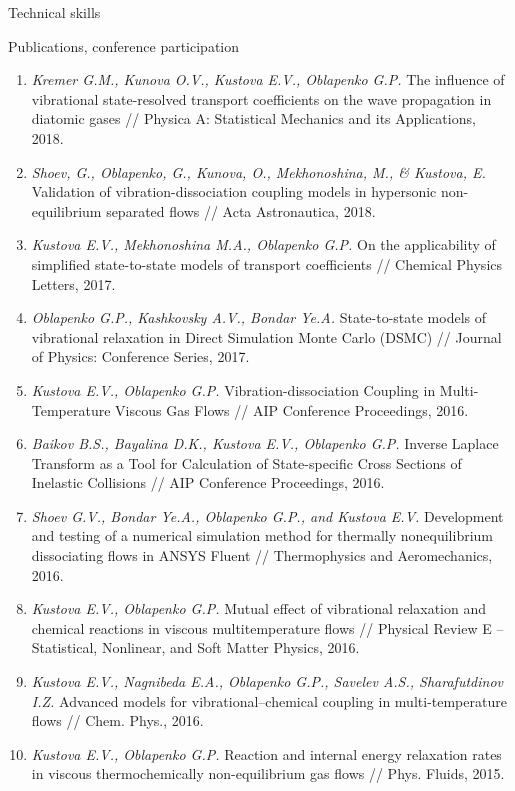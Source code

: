 \documentclass{resume} %
\begin{document}
\begin{rSection}{Technical skills}
\begin{rSection}{Publications, conference participation}
\begin{enumerate}
\item \emph{Kremer G.M., Kunova O.V., Kustova E.V., Oblapenko G.P.} The influence of vibrational state-resolved transport coefficients on the wave propagation in diatomic gases // Physica A: Statistical Mechanics and its Applications, 2018.

\item \emph{Shoev, G., Oblapenko, G., Kunova, O., Mekhonoshina, M., \& Kustova, E.} Validation of vibration-dissociation coupling models in hypersonic non-equilibrium separated flows // Acta Astronautica, 2018.

\item \emph{Kustova E.V., Mekhonoshina M.A., Oblapenko G.P.} On the applicability of simplified state-to-state models of transport coefficients // Chemical Physics Letters, 2017.

\item \emph{Oblapenko G.P., Kashkovsky A.V., Bondar Ye.A.} State-to-state models of vibrational relaxation in Direct Simulation Monte Carlo (DSMC) // Journal of Physics: Conference Series, 2017.

\item  \emph{Kustova E.V., Oblapenko G.P.} Vibration-dissociation Coupling in Multi-Temperature Viscous Gas Flows // AIP Conference Proceedings, 2016.

\item  \emph{Baikov B.S., Bayalina D.K., Kustova E.V., Oblapenko G.P.} Inverse Laplace Transform as a Tool for Calculation of State-specific Cross Sections of Inelastic Collisions // AIP Conference Proceedings, 2016.

\item  \emph{Shoev G.V., Bondar Ye.A., Oblapenko G.P., and Kustova E.V.} Development and testing of a numerical simulation method for thermally nonequilibrium dissociating flows in ANSYS Fluent // Thermophysics and Aeromechanics, 2016.

\item  \emph{Kustova E.V., Oblapenko G.P.} Mutual effect of vibrational relaxation and chemical reactions in viscous multitemperature flows // Physical Review E -- Statistical, Nonlinear, and Soft Matter Physics, 2016.

\item  \emph{Kustova E.V., Nagnibeda E.A., Oblapenko G.P., Savelev A.S., Sharafutdinov I.Z.} Advanced models for vibrational–chemical coupling in multi-temperature flows // Chem. Phys., 2016.

\item  \emph{Kustova E.V., Oblapenko G.P.} Reaction and internal energy relaxation rates in viscous thermochemically non-equilibrium gas flows // Phys. Fluids, 2015.


\end{enumerate}
\end{rSection}
\end{rSection}
\end{document}
